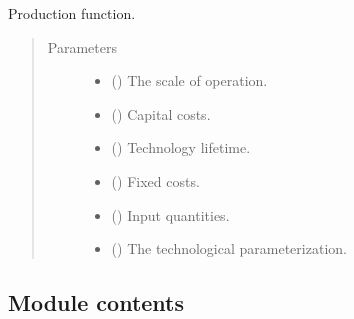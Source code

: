 \documentclass[letterpaper,10pt,english]{sphinxmanual}
\begin{document}
\begin{fulllineitems}
\label{\detokenize{technology:technology.tutorial_basic.production}}
Production function.
\begin{quote}\begin{description}
\item[{Parameters}] \leavevmode\begin{itemize}
\item {} 
 () \textendash{} The scale of operation.

\item {} 
 () \textendash{} Capital costs.

\item {} 
 () \textendash{} Technology lifetime.

\item {} 
 () \textendash{} Fixed costs.

\item {} 
 () \textendash{} Input quantities.

\item {} 
 () \textendash{} The technological parameterization.

\end{itemize}

\end{description}\end{quote}

\end{fulllineitems}



\subsection{Module contents}
\label{\detokenize{technology:module-technology}}\label{\detokenize{technology:module-contents}}
\end{document}
